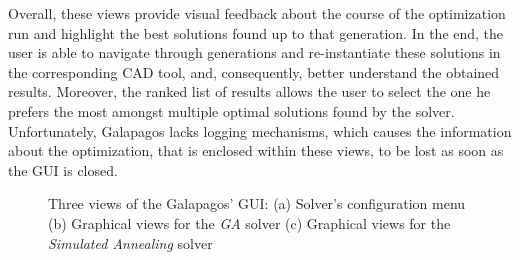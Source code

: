 	Overall, these views provide visual feedback about the course of the optimization run and highlight the best solutions found up to that generation. In the end, the user is able to navigate through generations and re-instantiate these solutions in the corresponding \ac{CAD} tool, and, consequently, better understand the obtained results. Moreover, the ranked list of results allows the user to select the one he prefers the most amongst multiple optimal solutions found by the solver. Unfortunately, Galapagos lacks logging mechanisms, which causes the information about the optimization, that is enclosed within these views, to be lost as soon as the \ac{GUI} is closed. 
	\begin{figure}[]
		\centering
		\hfill
		\hfill
		
		\caption[Galapagos GUI]{Three views of the Galapagos' \ac{GUI}: (a) Solver's configuration menu (b) Graphical views for the \textit{\ac{GA}} solver (c) Graphical views for the \textit{Simulated Annealing} solver}
		\label{fig:galapagos}
	\end{figure}
	
